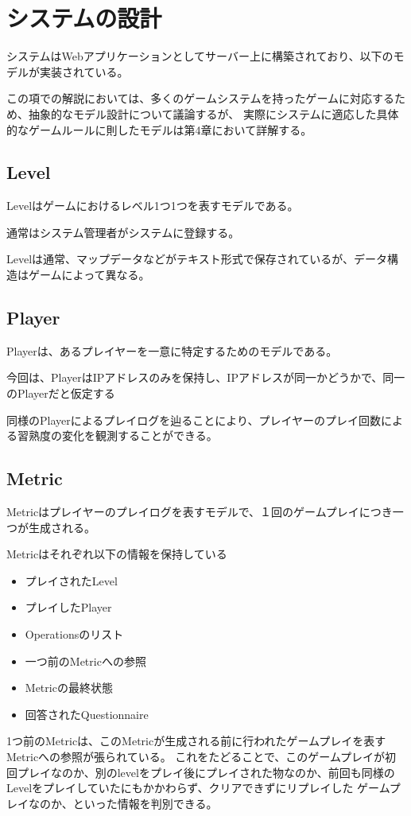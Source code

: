 \section{システムの設計}
システムはWebアプリケーションとしてサーバー上に構築されており、以下のモデルが実装されている。

この項での解説においては、多くのゲームシステムを持ったゲームに対応するため、抽象的なモデル設計について議論するが、
実際にシステムに適応した具体的なゲームルールに則したモデルは第4章において詳解する。

\subsection{Level}
Levelはゲームにおけるレベル1つ1つを表すモデルである。

通常はシステム管理者がシステムに登録する。

Levelは通常、マップデータなどがテキスト形式で保存されているが、データ構造はゲームによって異なる。

\subsection{Player}
Playerは、あるプレイヤーを一意に特定するためのモデルである。

今回は、PlayerはIPアドレスのみを保持し、IPアドレスが同一かどうかで、同一のPlayerだと仮定する


同様のPlayerによるプレイログを辿ることにより、プレイヤーのプレイ回数による習熟度の変化を観測することができる。

\subsection{Metric}
Metricはプレイヤーのプレイログを表すモデルで、１回のゲームプレイにつき一つが生成される。

Metricはそれぞれ以下の情報を保持している

\begin{itemize}
  \item プレイされたLevel
  \item プレイしたPlayer
  \item Operationsのリスト
  \item 一つ前のMetricへの参照
  \item Metricの最終状態
  \item 回答されたQuestionnaire
\end{itemize}

1つ前のMetricは、このMetricが生成される前に行われたゲームプレイを表すMetricへの参照が張られている。
これをたどることで、このゲームプレイが初回プレイなのか、別のlevelをプレイ後にプレイされた物なのか、前回も同様のLevelをプレイしていたにもかかわらず、クリアできずにリプレイした
ゲームプレイなのか、といった情報を判別できる。

